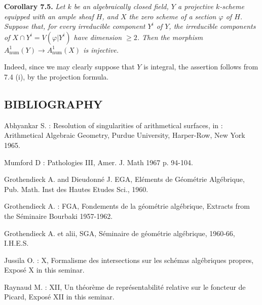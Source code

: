 \textbf{Corollary 7.5.}
\emph{Let $k$ be an algebraically closed field, $Y$ a projective $k$-scheme equipped with an ample sheaf $H$, and $X$ the zero scheme of a section $\varphi$ of $H$. Suppose that, for every irreducible component $Y^i$ of $Y$,
%
the irreducible components of $X\cap Y^i=V(\varphi|Y^i)$ have dimension $\geq2$. Then the morphism $A^1_{\mathrm{num}}(Y)\longrightarrow A^1_{\mathrm{num}}(X)$ is injective.}

Indeed, since we may clearly suppose that $Y$ is integral, the assertion follows from 7.4 (i), by the projection formula.

\subsection*{BIBLIOGRAPHY}
\begin{enumerate}[label={[\arabic*]}]
\item Abhyankar S. : Resolution of singularities of arithmetical surfaces, in : Arithmetical Algebraic Geometry, Purdue University, Harper-Row, New York 1965.
\item Mumford D : Pathologies III, Amer. J. Math 1967 p. 94-104.
\item Grothendieck A. and Dieudonn\'e J. EGA, El\'ements de G\'eom\'etrie Alg\'ebrique, Pub. Math. Inst des Hautes Etudes Sci., 1960.
\item Grothendieck A. : FGA, Fondements de la g\'eom\'etrie alg\'ebrique, Extracts from the S\'eminaire Bourbaki 1957-1962.
\item Grothendieck A. et alii, SGA, S\'eminaire de g\'eom\'etrie alg\'ebrique, 1960-66, I.H.E.S.
\item Jussila O. : X, Formalisme des intersections sur les sch\'emas alg\'ebriques propres, Expos\'e X in this seminar.
\item Raynaud M. : XII, Un th\'eor\`eme de repr\'esentabilit\'e relative sur le foncteur de Picard, Expos\'e XII in this seminar.
\end{enumerate}



\providecommand{\Kb}{K^\bullet}
\providecommand{\Db}{D}
\providecommand{\Gtop}{\operatorname{Gr}_{\mathrm{top}}}
\providecommand{\Ftop}{\operatorname{Fil}_{\mathrm{top}}}


